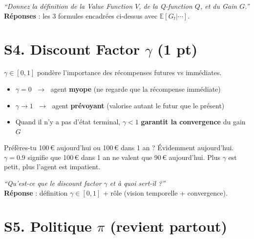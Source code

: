 \documentclass[11pt,a4paper]{article}
\newcommand{\E}{\mathbb{E}}
\begin{document}
\begin{exambox}
\textit{``Donnez la définition de la Value Function $V$, de la Q-function $Q$, et du Gain $G$.''}\\[4pt]
\textbf{Réponses} : les 3 formules encadrées ci-dessus avec $\E[G_t | \cdots]$.
\end{exambox}

\section[S4. Discount Factor gamma (1 pt)]{S4. Discount Factor $\gamma$ (1 pt)}

\begin{formbox}
$\gamma \in [0, 1]$ pondère l'importance des récompenses futures vs immédiates.
\begin{itemize}[nosep]
\item $\gamma = 0$ $\;\to\;$ agent \textbf{myope} (ne regarde que la récompense immédiate)
\item $\gamma \to 1$ $\;\to\;$ agent \textbf{prévoyant} (valorise autant le futur que le présent)
\item Quand il n'y a pas d'état terminal, $\gamma < 1$ \textbf{garantit la convergence} du gain $G$
\end{itemize}
\end{formbox}

\begin{exbox}
Préfères-tu 100\,\euro{} aujourd'hui ou 100\,\euro{} dans 1 an ? Évidemment aujourd'hui. $\gamma = 0.9$ signifie que 100\,\euro{} dans 1 an ne valent que 90\,\euro{} aujourd'hui. Plus $\gamma$ est petit, plus l'agent est impatient.
\end{exbox}

\begin{exambox}
\textit{``Qu'est-ce que le discount factor $\gamma$ et à quoi sert-il ?''}\\[4pt]
\textbf{Réponse} : définition $\gamma \in [0,1]$ + rôle (vision temporelle + convergence).
\end{exambox}

\section[S5. Politique pi (revient partout)]{S5. Politique $\pi$ (revient partout)}
\end{document}
